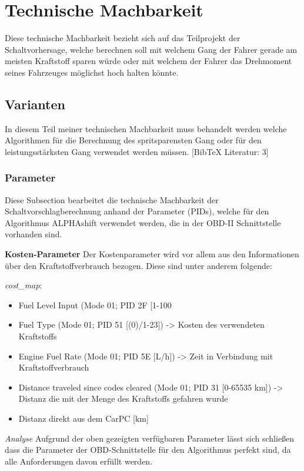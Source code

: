 \chapter {Technische Machbarkeit}
Diese technische Machbarkeit bezieht sich auf das Teilprojekt der Schaltvorhersage, welche berechnen soll mit welchem Gang der Fahrer gerade am meisten Kraftstoff sparen würde oder mit welchem der Fahrer das Drehmoment seines Fahrzeuges möglichst hoch halten könnte.

\section {Varianten}
In diesem Teil meiner technischen Machbarkeit muss behandelt werden welche Algorithmen für die Berechnung des spritsparensten Gang oder für den leistungsstärksten Gang verwendet werden müssen.
[BibTeX Literatur: 3]

	\subsection {Parameter}
	Diese Subsection bearbeitet die technische Machbarkeit der Schaltvorschlagberechnung anhand der Parameter (PIDs), welche für den Algorithmus ALPHAshift verwendet werden, die in der OBD-II Schnittstelle vorhanden sind.

	\textbf{Kosten-Parameter} \nextline
	Der Kostenparameter wird vor allem aus den Informationen über den Kraftstoffverbrauch bezogen. 
	Diese sind unter anderem folgende:

	\textit{cost\_map}:
	\begin{itemize}
		\item Fuel Level Input (Mode 01; PID 2F [1-100%
		\item Fuel Type (Mode 01; PID 51 [(0)/1-23]) -> Kosten des verwendeten Kraftstoffs
		\item Engine Fuel Rate (Mode 01; PID 5E [L/h]) -> Zeit in Verbindung mit Kraftstoffverbrauch 
		\item Distance traveled since codes cleared (Mode 01; PID 31 [0-65535 km]) -> Distanz die mit der Menge des Kraftstoffs gefahren wurde
		\item Distanz direkt aus dem CarPC [km]
	\end{itemize}

	\textit{Analyse}
	Aufgrund der oben gezeigten verfügbaren Parameter lässt sich schließen dass die Parameter der OBD-Schnittstelle für den Algorithmus perfekt sind, da alle Anforderungen davon erfüllt werden.

